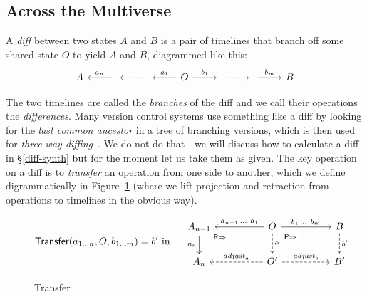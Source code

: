 \documentclass[english,submission]{programming}
\theoremstyle{definition}
\begin{document}
\subsection{Across the Multiverse}\label{transfer}

A \textit{diff} between two states $A$ and $B$ is a pair of timelines that branch off some shared state $O$ to yield $A$ and $B$, diagrammed like this:
\[\begin{tikzcd}
	A & {} & {} & O & {} & {} & B
	\arrow["{{a_n}}"', from=1-2, to=1-1]
	\arrow[dotted, from=1-3, to=1-2]
	\arrow["{{a_1}}"', from=1-4, to=1-3]
	\arrow["{b_1}", from=1-4, to=1-5]
	\arrow[dotted, from=1-5, to=1-6]
	\arrow["{b_m}", from=1-6, to=1-7]
\end{tikzcd}\]

The two timelines are called the \textit{branches} of the diff and we call their operations the \textit{differences}. Many version control systems use something like a diff by looking for the \textit{last common ancestor} in a tree of branching versions, which is then used for \textit{three-way diffing}~\cite{diff3}. We do not do that---we will discuss how to calculate a diff in \S\ref{diff-synth} but for the moment let us take them as given. The key operation on a diff is to
\textit{transfer} an operation from one side to another, which we define digrammatically in Figure~\ref{fig:transfer} (where we lift projection and retraction from operations to timelines in the obvious way).
\vspace{-16pt}
\begin{figure}[h]
\[
\textsf{Transfer}(a_{1\ldots n}, O, b_{1\ldots m}) = b' \textrm{ in }\quad
\begin{tikzcd}[column sep = huge]
	A_{n-1} & O & B \\
	A_n & {O'} & {B'}
	\arrow["{a_n}"', from=1-1, to=2-1]
	\arrow["{\textsf{R}\Rightarrow}"{description, pos=0.1}, draw=none, from=1-1, to=2-2]
	\arrow["{a_{n-1}\,\ldots\  a_1}"', from=1-2, to=1-1]
	\arrow["{b_1\,\ldots \  b_m}", from=1-2, to=1-3]
	\arrow["o", dashed, from=1-2, to=2-2]
	\arrow["{\textsf{P}\Rightarrow}"{description, pos=0.2}, draw=none, from=1-2, to=2-3]
	\arrow["{b'}", dashed, from=1-3, to=2-3]
	\arrow["{\mathit{adjust}_a}"', dashed, from=2-2, to=2-1]
	\arrow["{\mathit{adjust}_b}", dashed, from=2-2, to=2-3]
\end{tikzcd}\]
\vspace{-16pt}
\caption{Transfer}
\label{fig:transfer}
\end{figure}
\end{document}
